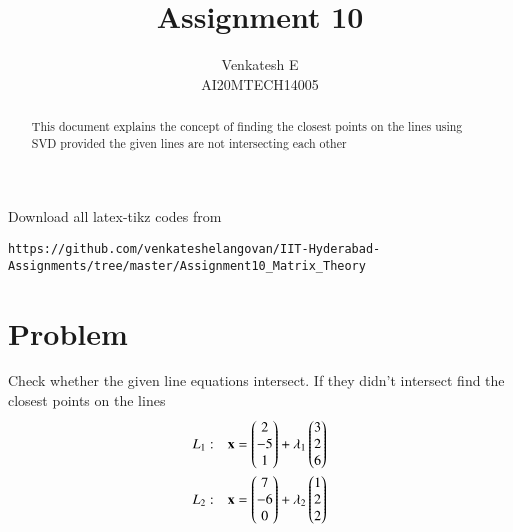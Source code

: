 \documentclass[journal,12pt,twocolumn]{IEEEtran}
\begin{document}
\makeatletter
{}
\makeatother
\let\StandardTheFigure\thefigure
\let\vec\mathbf
\renewcommand{\thefigure}{\theproblem}
\def\putbox#1#2#3{\makebox[0in][l]{\makebox[#1][l]{}\raisebox{\baselineskip}[0in][0in]{\raisebox{#2}[0in][0in]{#3}}}}
     \def\rightbox#1{\makebox[0in][r]{#1}}
     \def\centbox#1{\makebox[0in]{#1}}
     \def\topbox#1{\raisebox{-\baselineskip}[0in][0in]{#1}}
     \def\midbox#1{\raisebox{-0.5\baselineskip}[0in][0in]{#1}}
\vspace{3cm}
\title{Assignment 10}
\author{Venkatesh E\\AI20MTECH14005}
\maketitle
\newpage
\bigskip
\renewcommand{\thefigure}{\theenumi}
\renewcommand{\thetable}{\theenumi}
\begin{abstract}
This document explains the concept of finding the closest points on the lines using SVD provided the given lines are not intersecting each other
\end{abstract}
Download all latex-tikz codes from 
%
\begin{lstlisting}
https://github.com/venkateshelangovan/IIT-Hyderabad-Assignments/tree/master/Assignment10_Matrix_Theory
\end{lstlisting}
\section{Problem}
Check whether the given line equations intersect. If they didn't intersect find the closest points on the lines 
\begin{align}
L_1 & : & \vec{x}=\myvec{2\\-5\\1}+\lambda_1\myvec{3\\2\\6}\\
L_2 & : & \vec{x}=\myvec{7\\-6\\0}+\lambda_2\myvec{1\\2\\2}
\end{align}
\end{document}
